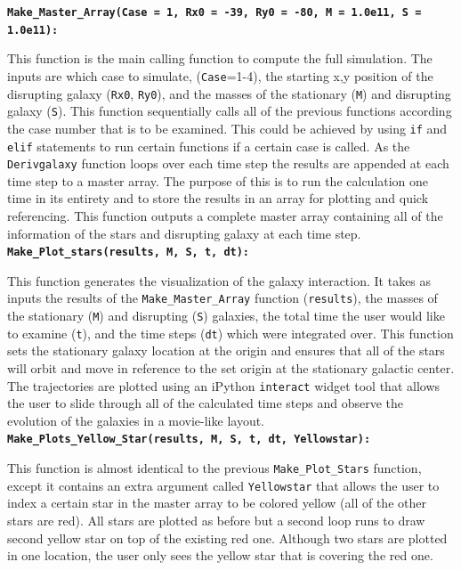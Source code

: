 \documentclass[11pt]{article}
\begin{document}
\textbf{\texttt{Make\_Master\_Array(Case = 1, Rx0 = -39, Ry0 = -80, M = 1.0e11, S = 1.0e11):}}

This function is the main calling function to compute the full simulation.  The inputs are which case to simulate, (\texttt{Case}=1-4), the starting x,y position of the disrupting galaxy (\texttt{Rx0}, \texttt{Ry0}), and the masses of the stationary (\texttt{M}) and disrupting galaxy (\texttt{S}).  This function sequentially calls all of the previous functions according the case number that is to be examined.  This could be achieved by using \texttt{if} and \texttt{elif} statements to run certain functions if a certain case is called.   As the \texttt{Derivgalaxy} function loops over each time step the results are appended at each time step to a master array.  The purpose of this is to run the calculation one time in its entirety and to store the results in an array for plotting and quick referencing.  This function outputs a complete master array containing all of the information of the stars and disrupting galaxy at each time step.\\

\textbf{\texttt{Make\_Plot\_stars(results, M, S, t, dt):}}

This function generates the visualization of the galaxy interaction.  It takes as inputs the results of the \texttt{Make\_Master\_Array} function (\texttt{results}), the masses of the stationary (\texttt{M}) and disrupting (\texttt{S}) galaxies, the total time the user would like to examine (\texttt{t}), and the time steps (\texttt{dt}) which were integrated over.  This function sets the stationary galaxy location at the origin and ensures that all of the stars will orbit and move in reference to the set origin at the stationary galactic center.  The trajectories are plotted using an iPython \texttt{interact} widget tool that allows the user to slide through all of the calculated time steps and observe the evolution of the galaxies in a movie-like layout. \\

\textbf{\texttt{Make\_Plots\_Yellow\_Star(results, M, S, t, dt, Yellowstar):}}

This function is almost identical to the previous \texttt{Make\_Plot\_Stars} function, except it contains an extra argument called \texttt{Yellowstar} that allows the user to index a certain star in the master array to be colored yellow (all of the other stars are red).  All stars are plotted as before but a second loop runs to draw second yellow star on top of the existing red one.  Although two stars are plotted in one location, the user only sees the yellow star that is covering the red one. 
\end{document}
